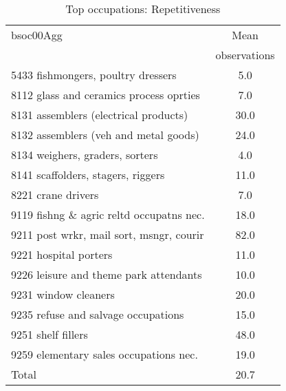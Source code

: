 \begin{table}
	\centering
	\caption{Top occupations: Repetitiveness}
	\begin{tabular}{lc}
	\toprule	
		
bsoc00Agg&Mean \\
&observations \\
\hline
5433 fishmongers, poultry dressers&5.0 \\
8112 glass and ceramics process oprties&7.0 \\
8131 assemblers (electrical products)&30.0 \\
8132 assemblers (veh and metal goods)&24.0 \\
8134 weighers, graders, sorters&4.0 \\
8141 scaffolders, stagers, riggers&11.0 \\
8221 crane drivers&7.0 \\
9119 fishng \& agric reltd occupatns nec.&18.0 \\
9211 post wrkr, mail sort, msngr, courir&82.0 \\
9221 hospital porters&11.0 \\
9226 leisure and theme park attendants&10.0 \\
9231 window cleaners&20.0 \\
9235 refuse and salvage occupations&15.0 \\
9251 shelf fillers&48.0 \\
9259 elementary sales occupations nec.&19.0 \\
Total&20.7 \\
\bottomrule
\bottomrule
\end{tabular}
\end{table}
